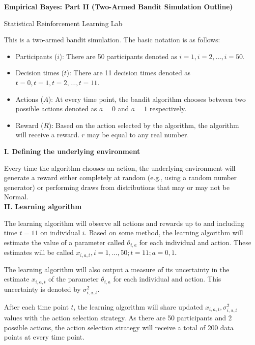 \documentclass[letterpaper, 11pt]{extarticle}
\begin{document}


\newpage
\begin{Large}
    \textsf{\textbf{Empirical Bayes: Part II (Two-Armed Bandit Simulation Outline)}}   \par
    Statistical Reinforcement Learning Lab
\end{Large}

\vspace{2ex}

This is a two-armed bandit simulation. The basic notation is as follows: 
\begin{itemize}
    \item Participants ($i$): There are 50 participants denoted as $i=1, i=2, \dots, i=50$.
    \item Decision times ($t$): There are 11 decision times denoted as $t=0, t=1, t=2,\dots,t=11$. 
    \item Actions ($A$): At every time point, the bandit algorithm chooses between two possible actions denoted as $a=0$ and $a=1$ respectively. 
    \item Reward ($R$): Based on the action selected by the algorithm, the algorithm will receive a reward. $r$ may be equal to any real number. 
\end{itemize}

\textsf{\textbf {I. Defining the underlying environment}}

Every time the algorithm chooses an action, the underlying environment will generate a reward either completely at random (e.g., using a random number generator) or performing draws from distributions that may or may not be Normal. \\

\textsf{\textbf {II. Learning algorithm}}

The learning algorithm will observe all  actions and rewards  up to and including time $t=11$ on individual $i$. Based on some method, the learning algorithm will estimate the value of a parameter called $\theta_{i,a}$ for each individual and action. These estimates will be called $x_{i,a,t}, i=1,...,50; t=11; a=0,1$.

The learning algorithm will also output a measure of its uncertainty in the estimate $x_{i,a,t}$ of the parameter $\theta_{i,a}$ for each individual and action.  This uncertainty is denoted by $\sigma^2_{i,a,t}$.

After each time point $t$, the learning algorithm will share updated $x_{i,a,t}, \sigma^2_{i,a,t}$ values with the action selection strategy. As there are 50 participants and 2 possible actions, the action selection strategy will receive a total of 200 data points at every time point.  \\
\end{document}
